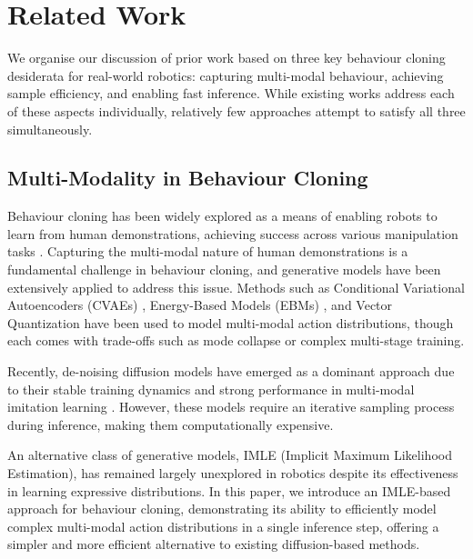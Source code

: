 

\section{Related Work}

We organise our discussion of prior work based on three key behaviour cloning desiderata for real-world robotics: capturing multi-modal behaviour, achieving sample efficiency, and enabling fast inference. While existing works address each of these aspects individually, relatively few approaches attempt to satisfy all three simultaneously.

\subsection{Multi-Modality in Behaviour Cloning}

Behaviour cloning has been widely explored as a means of enabling robots to learn from human demonstrations, achieving success across various manipulation tasks \cite{zhang2018deep, florence2019self, mandlekar2020learning, mandlekar2020iris, zeng2021transporter, rahmatizadeh2018vision, avigal2022speedfolding, atkeson1997robot, argall2009survey, ravichandar2020recent, chen2024diffusion, chiDiffusionPolicyVisuomotor2023b, Chen-RSS-24, Chi-RSS-24}. Capturing the multi-modal nature of human demonstrations is a fundamental challenge in behaviour cloning, and generative models have been extensively applied to address this issue. Methods such as Conditional Variational Autoencoders (CVAEs) \cite{lynch2020learning, zhaoLearningFineGrainedBimanual2023}, Energy-Based Models (EBMs) \cite{ibc}, and Vector Quantization \cite{leebehavior} have been used to model multi-modal action distributions, though each comes with trade-offs such as mode collapse or complex multi-stage training.

Recently, de-noising diffusion models have emerged as a dominant approach due to their stable training dynamics and strong performance in multi-modal imitation learning \cite{chen2024diffusion, chiDiffusionPolicyVisuomotor2023b, Chen-RSS-24, Chi-RSS-24, liu2024rdt}. However, these models require an iterative sampling process during inference, making them computationally expensive. 

An alternative class of generative models, IMLE (Implicit Maximum Likelihood Estimation), has remained largely unexplored in robotics despite its effectiveness in learning expressive distributions. In this paper, we introduce an IMLE-based approach for behaviour cloning, demonstrating its ability to efficiently model complex multi-modal action distributions in a single inference step, offering a simpler and more efficient alternative to existing diffusion-based methods.

